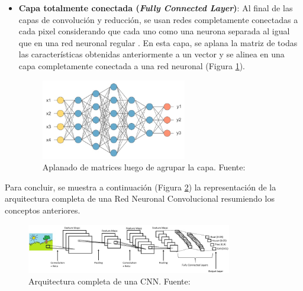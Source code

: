 \begin{itemize}
\begin{itemize}
\begin{itemize}
			\item \textbf{Capa totalmente conectada (\textit{Fully Connected Layer})}: Al final de las capas de convolución y reducción, se usan redes completamente conectadas a cada pixel considerando que cada uno como una neurona separada al igual que en una red neuronal regular \parencite{tec_lopez2016cnnTF}. En esta capa, se aplana la matriz de todas las características obtenidas anteriormente a un vector y se alinea en una capa completamente conectada a una red neuronal (Figura \ref{2:fig32}).
			\begin{figure}[h]
				\begin{center}
					\includegraphics[width=0.60\textwidth]{2/figures/fully_conected_cnn.jpg}
					\caption[Aplanado de matrices luego de agrupar la capa]{Aplanado de matrices luego de agrupar la capa. Fuente: \cite{tec_prabhu2018cnn}}
					\label{2:fig32}
				\end{center}
			\end{figure}
		\end{itemize}
		Para concluir, se muestra a continuación (Figura \ref{2:fig33}) la representación de la arquitectura completa de una Red Neuronal Convolucional resumiendo los conceptos anteriores.
		\begin{figure}[h]
			\begin{center}
				\includegraphics[width=0.8\textwidth]{2/figures/arquitectura_cnn.jpg}
				\caption[Arquitectura completa de una CNN]{Arquitectura completa de una CNN. Fuente: \cite{tec_prabhu2018cnn}}
				\label{2:fig33}
			\end{center}
		\end{figure}
		

\end{itemize}
\end{itemize}

